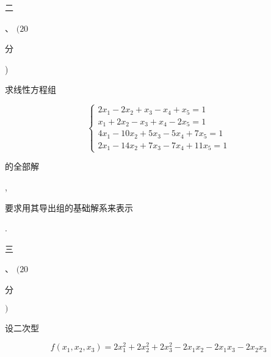 \documentclass[10pt]{article}
\begin{document}
\begin{CJK}{UTF8}{mj}二\end{CJK}、 $(20$ \begin{CJK}{UTF8}{mj}分\end{CJK}) \begin{CJK}{UTF8}{mj}求线性方程组\end{CJK}
$$
\left\{\begin{array}{l}
2 x_{1}-2 x_{2}+x_{3}-x_{4}+x_{5}=1 \\
x_{1}+2 x_{2}-x_{3}+x_{4}-2 x_{5}=1 \\
4 x_{1}-10 x_{2}+5 x_{3}-5 x_{4}+7 x_{5}=1 \\
2 x_{1}-14 x_{2}+7 x_{3}-7 x_{4}+11 x_{5}=1
\end{array}\right.
$$
\begin{CJK}{UTF8}{mj}的全部解\end{CJK}, \begin{CJK}{UTF8}{mj}要求用其导出组的基础解系来表示\end{CJK}.

\begin{CJK}{UTF8}{mj}三\end{CJK}、 $(20$ \begin{CJK}{UTF8}{mj}分\end{CJK} $)$ \begin{CJK}{UTF8}{mj}设二次型\end{CJK}
$$
f\left(x_{1}, x_{2}, x_{3}\right)=2 x_{1}^{2}+2 x_{2}^{2}+2 x_{3}^{2}-2 x_{1} x_{2}-2 x_{1} x_{3}-2 x_{2} x_{3}
$$
\end{document}
